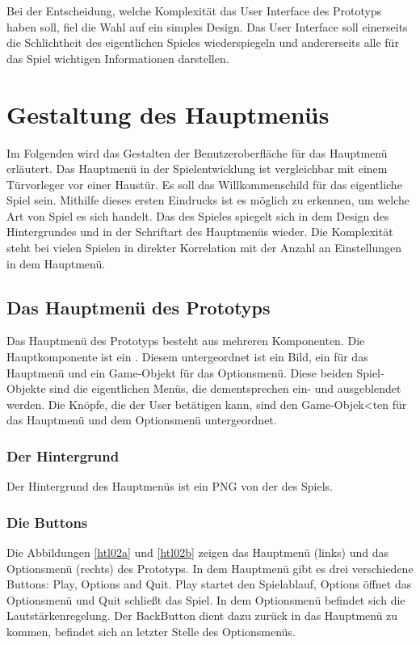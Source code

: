 \noindent
Bei der Entscheidung, welche Komplexität das User Interface des Prototyps haben soll, fiel die Wahl auf ein simples Design. 
Das User Interface soll einerseits die Schlichtheit des eigentlichen Spieles wiederspiegeln und andererseits alle für das Spiel wichtigen Informationen darstellen.

\section{Gestaltung des Hauptmenüs}

Im Folgenden wird das Gestalten der Benutzeroberfläche für das Hauptmenü erläutert. 
Das Hauptmenü in der Spielentwicklung ist vergleichbar mit einem Türvorleger vor einer Haustür. Es soll das Willkommenschild für das eigentliche Spiel sein. 
Mithilfe dieses ersten Eindrucks ist es möglich zu erkennen, um welche Art von Spiel es sich handelt. Das  des Spieles spiegelt sich in dem Design des Hintergrundes und in der Schriftart des Hauptmenüs wieder. Die Komplexität steht bei vielen Spielen in direkter Korrelation mit der Anzahl an Einstellungen in dem Hauptmenü.

\pagebreak

\subsection{Das Hauptmenü des Prototyps}

Das Hauptmenü des Prototyps besteht aus mehreren Komponenten. Die Hauptkomponente ist ein . Diesem untergeordnet ist ein Bild, ein  für das Hauptmenü und ein Game-Objekt für das Optionsmenü. Diese beiden Spiel-Objekte sind die eigentlichen Menüs, die dementsprechen ein- und ausgeblendet werden. Die Knöpfe, die der User betätigen kann, sind den Game-Objek<ten für das Hauptmenü und dem Optionsmenü untergeordnet. 

\subsubsection{Der Hintergrund}
Der Hintergrund des Hauptmenüs ist ein PNG von der  des Spiels. 
\subsubsection{Die Buttons}
Die Abbildungen \ref{htl02a} und \ref{htl02b} zeigen das Hauptmenü (links) und das Optionsmenü (rechts) des Prototyps. In dem Hauptmenü gibt es drei verschiedene Buttons: Play, Options and Quit. Play startet den Spielablauf, Options öffnet das Optionsmenü und Quit schließt das Spiel. In dem Optionsmenü befindet sich die Lautstärkenregelung. Der \glqq Back\grqq \space Button dient dazu zurück in das Hauptmenü zu kommen, befindet sich an letzter Stelle des Optionsmenüs.


